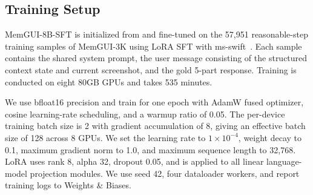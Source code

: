 \subsection{Training Setup}
\label{sec:appendix-training-setup}

MemGUI-8B-SFT is initialized from  and fine-tuned on the 57{,}951 reasonable-step training samples of MemGUI-3K using LoRA SFT with ms-swift~\cite{zhao2024swift}. Each sample contains the shared system prompt, the user message consisting of the structured context state and current screenshot, and the gold 5-part \conact response. Training is conducted on eight 80GB GPUs and takes 535 minutes.

We use bfloat16 precision and train for one epoch with AdamW fused optimizer, cosine learning-rate scheduling, and a warmup ratio of 0.05. The per-device training batch size is 2 with gradient accumulation of 8, giving an effective batch size of 128 across 8 GPUs. We set the learning rate to $1\times10^{-4}$, weight decay to 0.1, maximum gradient norm to 1.0, and maximum sequence length to 32{,}768. LoRA uses rank 8, alpha 32, dropout 0.05, and is applied to all linear language-model projection modules. We use seed 42, four dataloader workers, and report training logs to Weights \& Biases.

